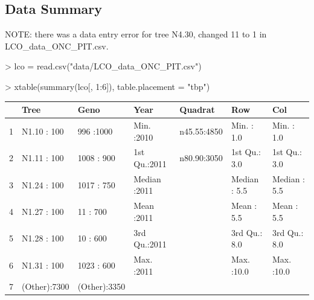 \documentclass[11pt]{amsart}
\begin{document}
\subsection{Data Summary}
NOTE: there was a data entry error for tree N4.30, changed 11 to 1 in LCO\_data\_ONC\_PIT.csv.

\begin{Schunk}
\begin{Sinput}
> lco = read.csv("data/LCO_data_ONC_PIT.csv")
\end{Sinput}
\end{Schunk}


\begin{Schunk}
\begin{Sinput}
> xtable(summary(lco[, 1:6]), table.placement = "tbp")
\end{Sinput}
\begin{table}[ht]
\begin{center}
\begin{tabular}{rllllll}
  \hline
 &      Tree &      Geno &      Year &   Quadrat &      Row &      Col \\ 
  \hline
1 & N1.10  : 100   & 996    :1000   & Min.   :2010   & n45.55:4850   & Min.   : 1.0   & Min.   : 1.0   \\ 
  2 & N1.11  : 100   & 1008   : 900   & 1st Qu.:2011   & n80.90:3050   & 1st Qu.: 3.0   & 1st Qu.: 3.0   \\ 
  3 & N1.24  : 100   & 1017   : 750   & Median :2011   &  & Median : 5.5   & Median : 5.5   \\ 
  4 & N1.27  : 100   & 11     : 700   & Mean   :2011   &  & Mean   : 5.5   & Mean   : 5.5   \\ 
  5 & N1.28  : 100   & 10     : 600   & 3rd Qu.:2011   &  & 3rd Qu.: 8.0   & 3rd Qu.: 8.0   \\ 
  6 & N1.31  : 100   & 1023   : 600   & Max.   :2011   &  & Max.   :10.0   & Max.   :10.0   \\ 
  7 & (Other):7300   & (Other):3350   &  &  &  &  \\ 
   \hline
\end{tabular}
\end{center}
\end{table}\end{Schunk}
\end{document}
